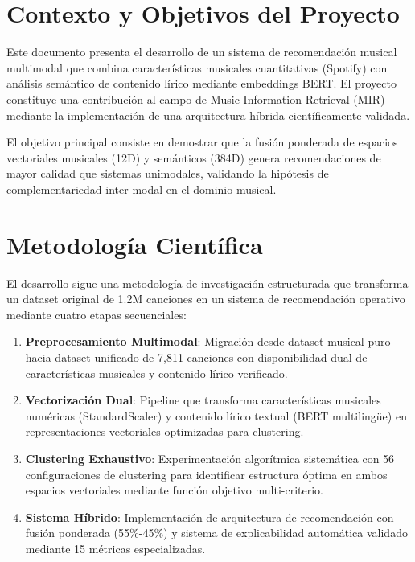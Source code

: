 \documentclass[12pt,a4paper]{report}
\begin{document}
\section*{Contexto y Objetivos del Proyecto}

Este documento presenta el desarrollo de un sistema de recomendación musical multimodal que combina características musicales cuantitativas (Spotify) con análisis semántico de contenido lírico mediante embeddings BERT. El proyecto constituye una contribución al campo de Music Information Retrieval (MIR) mediante la implementación de una arquitectura híbrida científicamente validada.

El objetivo principal consiste en demostrar que la fusión ponderada de espacios vectoriales musicales (12D) y semánticos (384D) genera recomendaciones de mayor calidad que sistemas unimodales, validando la hipótesis de complementariedad inter-modal en el dominio musical.

\section*{Metodología Científica}

El desarrollo sigue una metodología de investigación estructurada que transforma un dataset original de 1.2M canciones en un sistema de recomendación operativo mediante cuatro etapas secuenciales:

\begin{enumerate}
\item \textbf{Preprocesamiento Multimodal}: Migración desde dataset musical puro hacia dataset unificado de 7,811 canciones con disponibilidad dual de características musicales y contenido lírico verificado.

\item \textbf{Vectorización Dual}: Pipeline que transforma características musicales numéricas (StandardScaler) y contenido lírico textual (BERT multilingüe) en representaciones vectoriales optimizadas para clustering.

\item \textbf{Clustering Exhaustivo}: Experimentación algorítmica sistemática con 56 configuraciones de clustering para identificar estructura óptima en ambos espacios vectoriales mediante función objetivo multi-criterio.

\item \textbf{Sistema Híbrido}: Implementación de arquitectura de recomendación con fusión ponderada (55\%-45\%) y sistema de explicabilidad automática validado mediante 15 métricas especializadas.
\end{enumerate}
\end{document}
